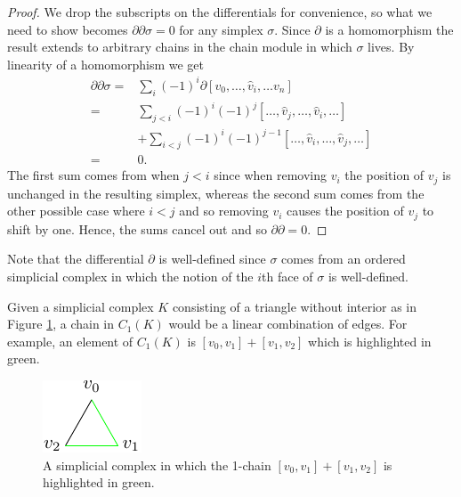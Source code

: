 \begin{proof}
  We drop the subscripts on the differentials for convenience, so what we need to show becomes $\partial \partial \sigma = 0 $ for any simplex $\sigma$. Since $\partial$ is a homomorphism the result extends to arbitrary chains in the chain module in which $\sigma$ lives. By linearity of a homomorphism we get
  \begin{align*}
    \partial \partial \sigma =& \sum_{i} (-1)^{i} \partial [v_{0}, \dots, \hat v_{i}, \dots v_{n}] \\
    =& \sum_{j < i} (-1)^{i} (-1)^{j} [ \dots,  \hat v_{j}, \dots , \hat v_{i}, \dots ] \\ &+ \sum_{i < j} (-1)^{i} (-1)^{j-1}  [ \dots,  \hat v_{i}, \dots , \hat v_{j}, \dots ] \\
    =& 0.
  \end{align*}
  The first sum comes from when $j<i$ since when removing $v_{i}$ the position of $v_{j}$ is unchanged in the resulting simplex, whereas the second sum comes from the other possible case where $i<j$ and so removing $v_{i}$ causes the position of $v_{j}$ to shift by one. Hence, the sums cancel out and so $\partial \partial = 0$. \end{proof}
Note that the differential $\partial$ is well-defined since $\sigma$ comes from an ordered simplicial complex in which the notion of the $i$th face of $\sigma$ is well-defined.
\begin{example}
Given a simplicial complex $K$ consisting of a triangle without interior as in Figure \ref{trichain}, a chain in $C_{1}(K)$ would be a linear combination of edges. For example, an element of $C_{1}(K)$ is $[v_{0},v_{1}]+[v_{1},v_{2}]$ which is highlighted in green.
\begin{figure}[ht]
  \centering
  \includegraphics[scale=2]{trichain.pdf}
  \caption{\label{trichain} A simplicial complex in which the 1-chain $[v_{0},v_{1}]+[v_{1},v_{2}]$ is highlighted in green.}
\end{figure}
\end{example}

